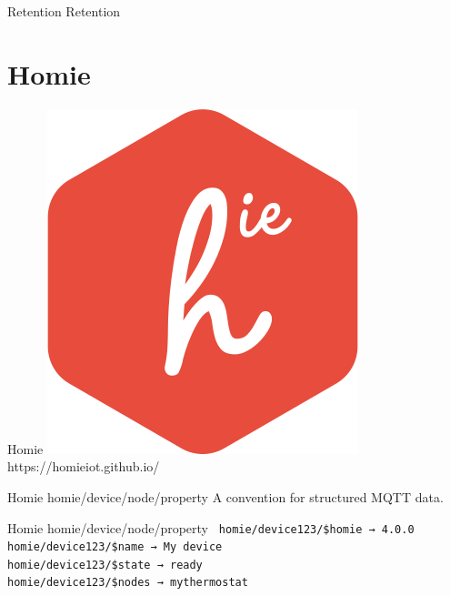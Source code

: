 \documentclass{presentation}
\begin{document}
\begin{frame}{Retention}
  Retention
\end{frame}

\section{Homie}

\begin{frame}{Homie}
  \center
  \includegraphics[width=\textwidth/3]{./Homie-logo.png} \\
  https://homieiot.github.io/
\end{frame}

\begin{frame}{Homie}
  \vfill
  {\huge homie/device/node/property}
  \vfill
  A convention for structured MQTT data.
\end{frame}

\begin{frame}{Homie}
  \vfill
  {\huge homie/device/node/property}
  \texttt{
  \vfill
  homie/device123/\$homie → 4.0.0 \\
  homie/device123/\$name → My device \\
  homie/device123/\$state → ready \\ 
  homie/device123/\$nodes → mythermostat \\
  }
\end{frame}
\end{document}
